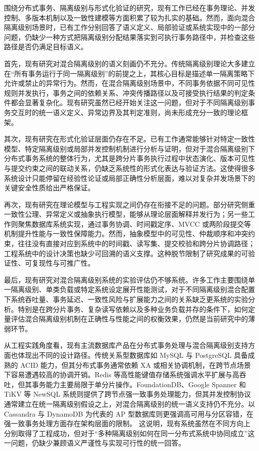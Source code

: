 围绕分布式事务、隔离级别与形式化验证的研究，现有工作已经在事务理论、并发控制、多版本机制以及一致性建模等方面积累了较为扎实的基础\cite{Gray1993,berenson1995critique,Terry2013,Bailis2014,Schultz2015}。然而，面向混合隔离级别场景时，已有工作分别回答了语义定义、局部验证或系统实现中的一部分问题，仍缺少一种方式把隔离级别分配结果落实到可执行事务路径中，并检查这些路径是否仍满足目标语义。

首先，现有研究对混合隔离级别的语义刻画仍不充分。传统隔离级别理论大多建立在“所有事务运行于同一隔离级别”的前提之上，其核心目标是描述单一隔离策略下允许或禁止的异常行为。然而，在混合隔离级别场景中，不同事务依据不同可见性规则并发执行，事务之间的依赖关系、冲突传播路径以及可接受执行结果的判定条件都会显著复杂化。现有研究虽然已经开始关注这一问题，但对于不同隔离级别事务交互时的统一语义定义、异常边界及其判定准则，尚未形成充分一致的理论框架\cite{bouajjani2025complexity}。

其次，现有研究在形式化验证层面仍存在不足。已有工作通常能够针对特定一致性模型、特定隔离级别或局部并发控制机制进行分析与证明，但对于混合隔离级别下分布式事务系统的整体行为，尤其是跨分片事务执行过程中状态演化、版本可见性与提交约束之间的联动关系，仍缺乏系统性的形式化表达与验证方法。这使得很多系统设计只能停留在经验性论证或局部正确性分析层面，难以对复杂并发场景下的关键安全性质给出严格保证。

再次，现有研究在理论模型与工程实现之间仍存在衔接不足的问题\cite{hawblitzel2015ironfleet}。部分研究侧重一致性公理、异常定义或抽象执行模型，能够从理论层面解释并发行为；另一些工作则聚焦数据库系统实现，通过事务协调、时间戳定序、MVCC 或两阶段提交等机制提升性能与一致性保障能力。然而，抽象模型中的可见性、仲裁顺序和冲突约束，往往没有直接对应到系统中的时间戳、读写集、提交校验和跨分片协调路径；工程系统中的设计决策也缺少可回溯的语义支撑。这种脱节限制了研究成果的可验证性、可复现性与可推广性。

最后，现有研究对混合隔离级别系统的实验评估仍不够系统。许多工作主要围绕单一隔离级别、单类负载或特定系统设定展开性能测试，对于不同隔离级别混合配置下系统吞吐量、事务延迟、一致性风险与扩展能力之间的关系缺乏更系统的实验分析。特别是在跨分片事务、复杂读写依赖以及多种业务负载并存的条件下，如何定量评估混合隔离级别机制在正确性与性能之间的权衡效果，仍然是当前研究中的薄弱环节。

从工程实践角度看，现有主流数据库产品在分布式事务处理与混合隔离级别支持方面也体现出不同的设计路径。传统关系型数据库如 MySQL 与 PostgreSQL 具备成熟的 ACID 能力，但其分布式事务通常依赖 XA 或相关协调机制，在跨节点场景下容易遭遇较高的协调开销\cite{Lampson1976}。Redis 等高性能键值存储系统强调水平扩展与高吞吐，但其事务能力主要局限于单分片操作\cite{Carlson2013}。FoundationDB、Google Spanner 和 TiKV 等 NewSQL 系统则提供了跨节点强一致事务处理能力\cite{Pavlo2011}，但其并发控制协议通常建立在统一隔离级别假设之上，对混合隔离级别的统一语义支持仍不充分。以 Cassandra 与 DynamoDB 为代表的 AP 型数据库则更强调高可用与分区容错，在强一致事务处理方面存在架构层面的限制\cite{DeCandia2007,Lakshman2010,Vogels2009}。
这说明，现有系统虽然在不同方向上分别取得了工程成功，但对于“多种隔离级别如何在同一分布式系统中协同成立”这一问题，仍缺少兼顾语义严谨性与实现可行性的统一回答\cite{harding2017evaluation}。

